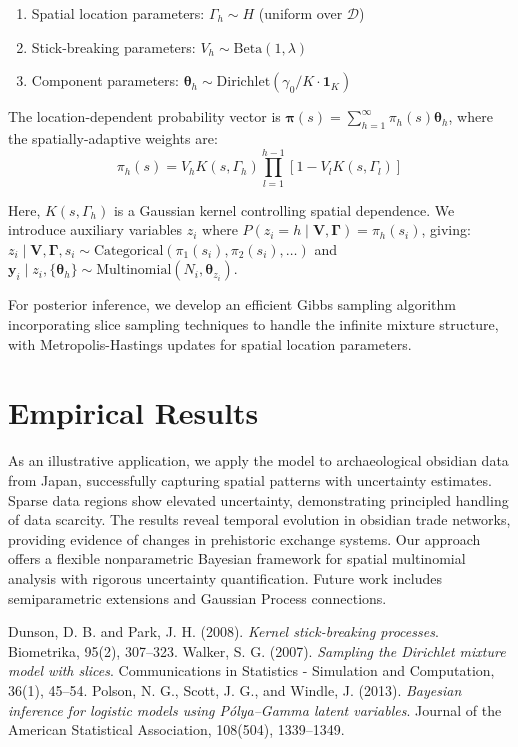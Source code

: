 \documentclass[a4paper,11pt]{article}
\begin{document}
\begin{enumerate}[1)]
\setlength{\parskip}{0cm}
\setlength{\itemsep}{0cm}
    \item Spatial location parameters: $\Gamma_h \sim H$ (uniform over $\mathcal{D}$)
    \item Stick-breaking parameters: $V_h \sim \text{Beta}(1, \lambda)$
    \item Component parameters: $\boldsymbol{\theta}_h \sim \text{Dirichlet}(\gamma_0/K \cdot \mathbf{1}_K)$
\end{enumerate}

The location-dependent probability vector is $\boldsymbol{\pi}(s) = \sum_{h=1}^{\infty} \pi_h(s) \boldsymbol{\theta}_h$, where the spatially-adaptive weights are:
$$
\pi_h(s) = V_h K(s, \Gamma_h) \prod_{l=1}^{h-1} [1 - V_l K(s, \Gamma_l)]
$$

Here, $K(s, \Gamma_h)$ is a Gaussian kernel controlling spatial dependence. We introduce auxiliary variables $z_i$ where $P(z_i = h \mid \mathbf{V}, \boldsymbol{\Gamma}) = \pi_h(s_i)$, giving: $z_i \mid \mathbf{V}, \boldsymbol{\Gamma}, s_i \sim \text{Categorical}(\pi_1(s_i), \pi_2(s_i), \ldots)$ and $\mathbf{y}_i \mid z_i, \{\boldsymbol{\theta}_h\} \sim \text{Multinomial}(N_i, \boldsymbol{\theta}_{z_i})$.

For posterior inference, we develop an efficient Gibbs sampling algorithm incorporating slice sampling techniques to handle the infinite mixture structure, with Metropolis-Hastings updates for spatial location parameters.

\vspace{-0.4cm}
\section{Empirical Results}
\vspace{-0.25cm}
As an illustrative application, we apply the model to archaeological obsidian data from Japan, successfully capturing spatial patterns with uncertainty estimates. Sparse data regions show elevated uncertainty, demonstrating principled handling of data scarcity. The results reveal temporal evolution in obsidian trade networks, providing evidence of changes in prehistoric exchange systems. Our approach offers a flexible nonparametric Bayesian framework for spatial multinomial analysis with rigorous uncertainty quantification. Future work includes semiparametric extensions and Gaussian Process connections.

\vspace{-0.1cm}
\footnotesize
{
\begin{thebibliography}{9}
 Dunson, D. B. and Park, J. H. (2008). {\it Kernel stick-breaking processes}. Biometrika, 95(2), 307--323.
 Walker, S. G. (2007). {\it Sampling the Dirichlet mixture model with slices}. Communications in Statistics - Simulation and Computation, 36(1), 45--54.
 Polson, N. G., Scott, J. G., and Windle, J. (2013). {\it Bayesian inference for logistic models using Pólya–Gamma latent variables}. Journal of the American Statistical Association, 108(504), 1339--1349.
\end{thebibliography}
}
\end{document}

